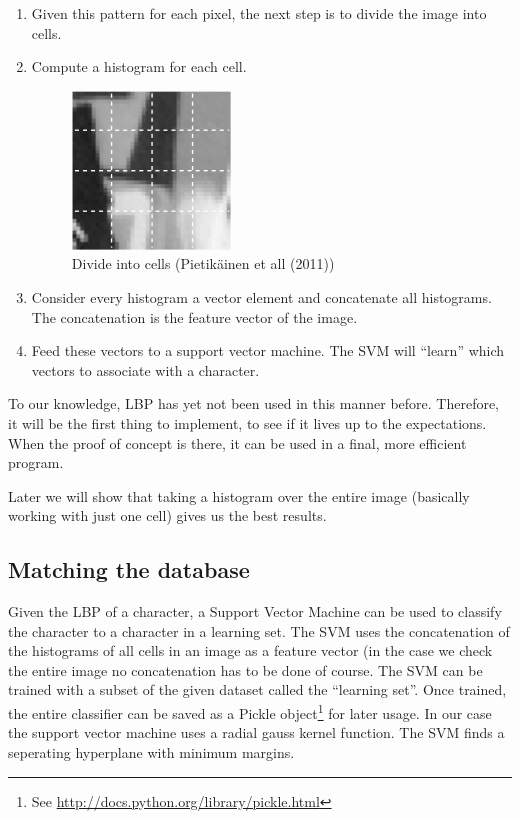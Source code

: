\documentclass[a4paper]{article}
\begin{document}
\begin{enumerate}
\item Given this pattern for each pixel, the next step is to divide the image
into cells.

\item Compute a histogram for each cell.

\begin{figure}[H]
    \center
    \includegraphics[scale=0.7]{cells.png}
    \caption{Divide into cells (Pietik\"ainen et all (2011))}
\end{figure}

\item Consider every histogram a vector element and concatenate all histograms.
The concatenation is the feature vector of the image.

\item Feed these vectors to a support vector machine. The SVM will ``learn''
which vectors to associate with a character.

\end{enumerate}

To our knowledge, LBP has yet not been used in this manner before. Therefore,
it will be the first thing to implement, to see if it lives up to the
expectations. When the proof of concept is there, it can be used in a final,
more efficient program.

Later we will show that taking a histogram over the entire image (basically
working with just one cell) gives us the best results.

\subsection{Matching the database}

Given the LBP of a character, a Support Vector Machine can be used to classify
the character to a character in a learning set. The SVM uses the concatenation
of the histograms of all cells in an image as a feature vector (in the case we
check the entire image no concatenation has to be done of course. The SVM can
be trained with a subset of the given dataset called the ``learning set''. Once
trained, the entire classifier can be saved as a Pickle object\footnote{See
\url{http://docs.python.org/library/pickle.html}} for later usage.
In our case the support vector machine uses a radial gauss kernel function. The
 SVM finds a seperating hyperplane with minimum margins.
\end{document}
